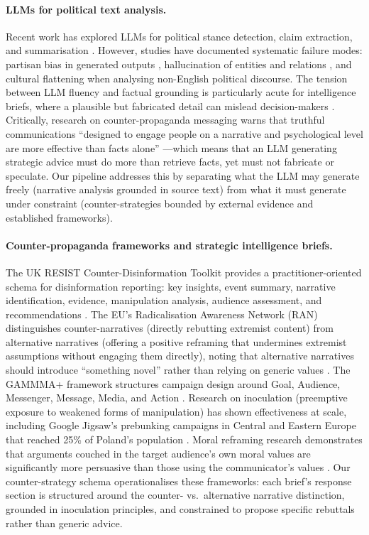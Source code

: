 \documentclass[10pt, a4paper]{article}
\begin{document}
\paragraph{LLMs for political text analysis.}
Recent work has explored LLMs for political stance detection, claim extraction, and summarisation \citep{ziems2024can, tornberg2023chatgpt}. However, studies have documented systematic failure modes: partisan bias in generated outputs \citep{feng2023partisan}, hallucination of entities and relations \citep{mandravickaite2025narrative, mckenna2023sources}, and cultural flattening when analysing non-English political discourse. The tension between LLM fluency and factual grounding is particularly acute for intelligence briefs, where a plausible but fabricated detail can mislead decision-makers \citep{llms_truth_democracy2025}. Critically, research on counter-propaganda messaging warns that truthful communications ``designed to engage people on a narrative and psychological level are more effective than facts alone'' \citep{carnegie2024countering}---which means that an LLM generating strategic advice must do more than retrieve facts, yet must not fabricate or speculate. Our pipeline addresses this by separating what the LLM may generate freely (narrative analysis grounded in source text) from what it must generate under constraint (counter-strategies bounded by external evidence and established frameworks).

\paragraph{Counter-propaganda frameworks and strategic intelligence briefs.}
The UK RESIST Counter-Disinformation Toolkit provides a practitioner-oriented schema for disinformation reporting: key insights, event summary, narrative identification, evidence, manipulation analysis, audience assessment, and recommendations \citep{resist2019}. The EU's Radicalisation Awareness Network (RAN) distinguishes counter-narratives (directly rebutting extremist content) from alternative narratives (offering a positive reframing that undermines extremist assumptions without engaging them directly), noting that alternative narratives should introduce ``something novel'' rather than relying on generic values \citep{ran2022alternative, briggs2015western}. The GAMMMA+ framework structures campaign design around Goal, Audience, Messenger, Message, Media, and Action \citep{silverman2016impact}. Research on inoculation (preemptive exposure to weakened forms of manipulation) has shown effectiveness at scale, including Google Jigsaw's prebunking campaigns in Central and Eastern Europe that reached 25\% of Poland's population \citep{roozenbeek2022psychological, jigsaw2023cee}. Moral reframing research demonstrates that arguments couched in the target audience's own moral values are significantly more persuasive than those using the communicator's values \citep{feinberg2015moral}. Our counter-strategy schema operationalises these frameworks: each brief's response section is structured around the counter- vs.\ alternative narrative distinction, grounded in inoculation principles, and constrained to propose specific rebuttals rather than generic advice.
\end{document}
